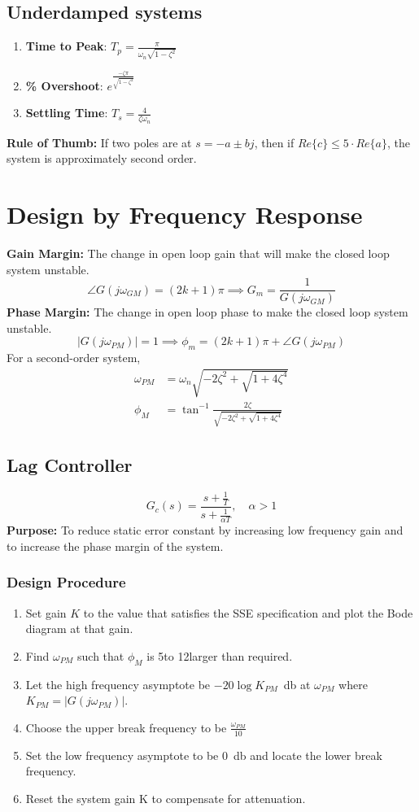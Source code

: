 \subsection*{Underdamped systems}
\begin{enumerate}
  \item[] \textbf{Time to Peak}: $T_p = \frac{\pi}{\omega_n\sqrt{1-\zeta^2}}$
  \item[] \textbf{\% Overshoot}: $e^{\frac{-\zeta\pi}{\sqrt{1-\zeta^2}}}$
  \item[] \textbf{Settling Time}: $T_s = \frac{4}{\zeta\omega_n}$
\end{enumerate}
\textbf{Rule of Thumb:} If two poles are at $s = -a\pm bj$, then if $Re\{c\} \leq 5\cdot Re\{a\}$, the system is approximately second order.
\clearpage
\section*{Design by Frequency Response}
\textbf{Gain Margin:} The change in open loop gain that will make the closed loop system unstable.
\[
  \angle G(j\omega_{GM}) = (2k+1)\pi \implies G_m = \frac{1}{G(j\omega_{GM})}
\]
\textbf{Phase Margin:} The change in open loop phase to make the closed loop system unstable.
\[
  |G(j\omega_{PM})| = 1 \implies \phi_{m} = (2k+1)\pi + \angle G(j\omega_{PM})
\]
For a second-order system,
\begin{align*}
  \omega_{PM} &= \omega_n\sqrt{-2\zeta^2+\sqrt{1+4\zeta^4}}\\
  \phi_M &= \tan^{-1}\frac{2\zeta}{\sqrt{-2\zeta^2+\sqrt{1+4\zeta^4}}}
\end{align*}
\subsection*{Lag Controller}
\[
  G_c(s) = \frac{s + \frac{1}{T}}{s + \frac{1}{\alpha T}}, \quad \alpha > 1
\]
\textbf{Purpose:} To reduce static error constant by increasing low frequency gain and to increase the phase margin of the system.
\subsubsection*{Design Procedure}
\begin{enumerate}
  \item Set gain $K$ to the value that satisfies the SSE specification and plot the Bode diagram at that gain.
  \item Find $\omega_{PM}$ such that $\phi_M$ is 5\textdegree  to 12\textdegree  larger than required.
  \item Let the high frequency asymptote be $-20\log K_{PM}$\SI{}{\decibel} at $\omega_{PM}$ where $K_{PM} = |G(j\omega_{PM})|$.
  \item Choose the upper break frequency to be $\frac{\omega_{PM}}{10}$
  \item Set the low frequency asymptote to be \SI{0}{\decibel} and locate the lower break frequency.
  \item Reset the system gain K to compensate for attenuation.
\end{enumerate}
